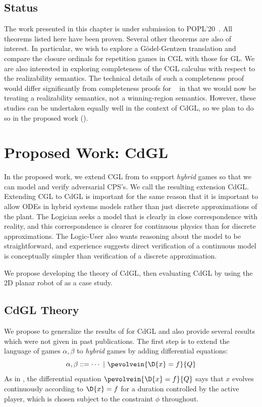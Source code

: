\documentclass[12pt]{cmuthesis}
\theoremstyle{definition}
\theoremstyle{remark}
\newcommand{\ivr}{Q}
\newcommand{\rref}[2][]{\prettyref{#2}}
\newcommand{\CGL}{\textsf{CGL}\xspace}
\newcommand{\CdGL}{\textsf{CdGL}\xspace}
\newcommand{\GL}{GL\xspace}
\begin{document}
\section{Status}
The work presented in this chapter is under submission to POPL'20~\cite{poplcgl}.
All theorems listed here have been proven.
Several other theorems are also of interest.
In particular, we wish to explore a G\"{o}del-Gentzen translation and compare the closure ordinals for repetition games in \CGL with those for \GL.
We are also interested in exploring completeness of the \CGL calculus with respect to the realizability semantics.
The technical details of such a completeness proof would differ significantly from completeness proofs for \dGL~\cite{DBLP:journals/tocl/Platzer17} in that we would now be treating a realizability semantics, not a winning-region semantics.
However, these studies can be undertaken equally well in the context of \CdGL, so we plan to do so in the proposed work (\rref{ch:cdgl}).

\chapter{Proposed Work: \CdGL}
\label{ch:cdgl}
In the proposed work, we extend \CGL from \rref{ch:cgl} to support \emph{hybrid} games so that we can model and verify adversarial CPS's.
We call the resulting extension \CdGL.
Extending \CGL to \CdGL is important for the same reason that it is important to allow ODEs in hybrid systems models rather than just discrete approximations of the plant.
The Logician seeks a model that is clearly in close correspondence with reality, and this correspondence is clearer for continuous physics than for discrete approximations.
The Logic-User also wants reasoning about the model to be straightforward, and experience suggests direct verification of a continuous model is conceptually simpler than verification of a discrete approximation.

We propose developing the theory of \CdGL, then evaluating \CdGL by using the 2D planar robot of \rref{sec:ground-robotics} as a case study.

\section{\CdGL Theory}
We propose to generalize the results of \rref{ch:cgl} for \CdGL and also provide several results which were not given in past publications.
The first step is to extend the language of games $\alpha,\beta$ to \emph{hybrid} games by adding differential equations:
\[\alpha,\beta ::= \cdots\ |\ \pevolvein{\D{x}=f}{\ivr}\]
As in \dGL, the differential equation $\pevolvein{\D{x}=f}{\ivr}$ says that $x$ evolves continuously according to $\D{x}=f$ for a duration controlled by the active player, which is chosen subject to the constraint $\phi$ throughout.
\end{document}
